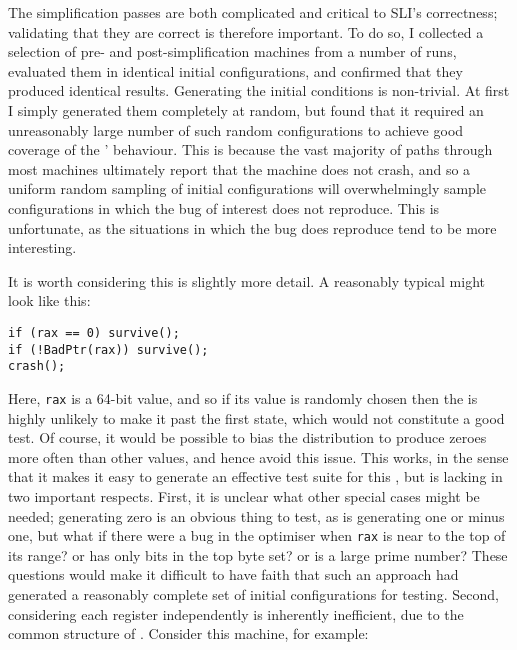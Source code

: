 

The {\StateMachine} simplification passes are both complicated and
critical to SLI's correctness; validating that they are correct is
therefore important.  To do so, I collected a selection of pre- and
post-simplification machines from a number of runs, evaluated them in
identical initial configurations, and confirmed that they produced
identical results.  Generating the initial conditions is non-trivial.
At first I simply generated them completely at random, but found that
it required an unreasonably large number of such random configurations
to achieve good coverage of the \StateMachines' behaviour.  This is
because the vast majority of paths through most machines ultimately
report that the machine does not crash, and so a uniform random
sampling of initial configurations will overwhelmingly sample
configurations in which the bug of interest does not reproduce.  This
is unfortunate, as the situations in which the bug does reproduce tend
to be more interesting.

It is worth considering this is slightly more detail.  A reasonably
typical \StateMachine might look like this:

\begin{verbatim}
if (rax == 0) survive();
if (!BadPtr(rax)) survive();
crash();
\end{verbatim}

Here, \verb|rax| is a 64-bit value, and so if its value is randomly
chosen then the {\StateMachine} is highly unlikely to make it past the
first state, which would not constitute a good test.  Of course, it
would be possible to bias the distribution to produce zeroes more
often than other values, and hence avoid this issue.  This works, in
the sense that it makes it easy to generate an effective test suite
for this \StateMachine, but is lacking in two important respects.
First, it is unclear what other special cases might be needed;
generating zero is an obvious thing to test, as is generating one or
minus one, but what if there were a bug in the optimiser when
\verb|rax| is near to the top of its range?  or has only bits in the
top byte set?  or is a large prime number?  These questions would make
it difficult to have faith that such an approach had generated a
reasonably complete set of initial configurations for testing.
Second, considering each register independently is inherently
inefficient, due to the common structure of \StateMachines.  Consider
this machine, for example:

